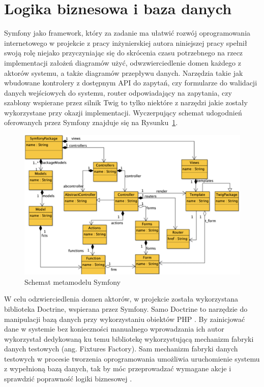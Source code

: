 \documentclass[12pt,twoside]{book}
\newcommand{\captionvspace}{\vspace{6pt}}
\begin{document}
\section{Logika biznesowa i baza danych}

Symfony jako framework, który za zadanie ma ułatwić rozwój oprogramowania internetowego w projekcie z pracy inżynierskiej autora niniejszej pracy spełnił swoją rolę niejako przyczyniając się do skrócenia czasu potrzebnego na rzecz implementacji założeń diagramów użyć, odwzwierciedlenie domen każdego z aktorów systemu, a także diagramów przepływu danych. Narzędzia takie jak wbudowane kontrolery z dostępnym API do zapytań, czy formularze do walidacji danych wejściowych do systemu, router odpowiadający na zapytania, czy szablony wspierane przez silnik Twig to tylko niektóre z narzędzi jakie zostały wykorzystane przy okazji implementacji. Wyczerpujący schemat udogodnień oferowanych przez Symfony znajduje się na Rysunku~\ref{fig:symfony-metadata-scheme}.

\begin{figure}[ht]
\centering
\includegraphics[width=\textwidth]{includes/images/symfony-metadata-scheme.png}
\captionvspace
\caption{Schemat metamodelu Symfony \cite{mod.driv.arch.symf}}
\label{fig:symfony-metadata-scheme}
\end{figure}

W celu odzwierciedlenia domen aktorów, w projekcie została wykorzystana biblioteka Doctrine, wspierana przez Symfony. Samo Doctrine to narzędzie do manipulacji bazą danych przy wykorzystaniu obiektów PHP \cite{symf.5}. By zainicjować dane w systemie bez konieczności manualnego wprowadzania ich autor wykorzystał dedykowaną ku temu bibliotekę wykorzystującą mechanizm fabryki danych testowych (ang. Fixtures Factory). Sam mechanizm fabryki danych testowych w procesie tworzenia oprogramowania umożliwia uruchomienie systemu z wypełnioną bazą danych, tak by móc przeprowadzać wymagane akcje i sprawdzić poprawność logiki biznesowej \cite{fixtures}.
\end{document}
